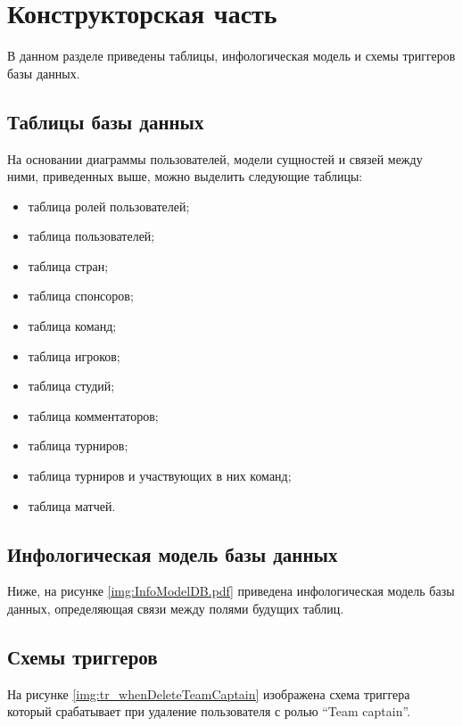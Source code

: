 \chapter{Конструкторская часть}
\label{cha:design}

В данном разделе приведены таблицы, инфологическая модель и схемы триггеров базы данных.


\section{Таблицы базы данных}
На основании диаграммы пользователей, модели сущностей и связей между ними, приведенных выше, можно выделить следующие таблицы:

\begin{itemize}
	\item таблица ролей пользователей;
	\item таблица пользователей;
	\item таблица стран;
	\item таблица спонсоров;
	\item таблица команд;
	\item таблица игроков;
	\item таблица студий;
	\item таблица комментаторов;
	\item таблица турниров;
	\item таблица турниров и участвующих в них команд;
	\item таблица матчей.
\end{itemize}

\newpage
\section{Инфологическая модель базы данных}
Ниже, на рисунке \ref{img:InfoModelDB.pdf} приведена инфологическая модель базы данных, определяющая связи между полями будущих таблиц.


\newpage
\section{Схемы триггеров}
На рисунке \ref{img:tr_whenDeleteTeamCaptain} изображена схема триггера который срабатывает при удаление пользователя с ролью \textquotedblleft Team captain\textquotedblright.

